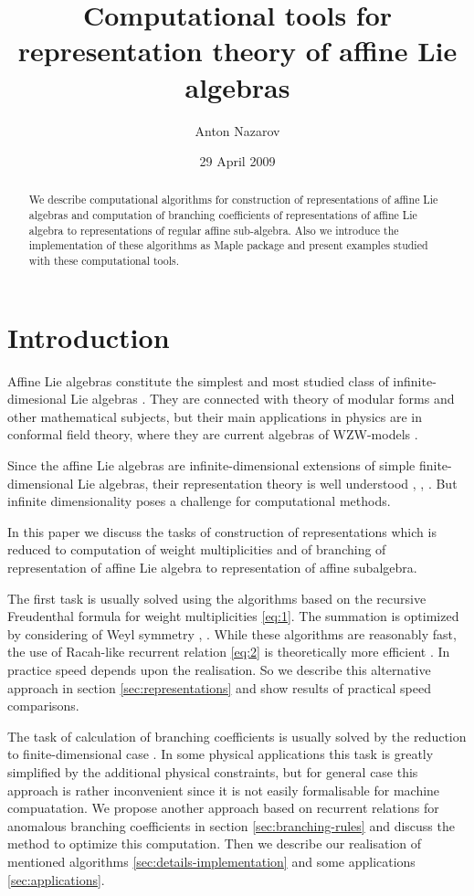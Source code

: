 \documentclass[a4paper,12pt]{article}
\title{Computational tools for representation theory of affine Lie algebras}
\author{Anton Nazarov}
\date{29 April 2009}
\theoremstyle{definition} \newtheorem{Def}{Definition}
\begin{document}
\maketitle
\begin{abstract}
  We describe computational algorithms for construction of
  representations of affine Lie algebras and computation of branching
  coefficients of representations of affine Lie algebra to
  representations of regular affine sub-algebra. Also we introduce the
  implementation of these algorithms as Maple package and present
  examples studied with these computational tools. 
\end{abstract}

\section{Introduction}
\label{sec:introduction}

Affine Lie algebras constitute the simplest and most studied class of
infinite-dimesional Lie algebras \cite{wakimoto2001idl,kac1990idl}. They are connected with theory of
modular forms and other mathematical subjects, but their main
applications in physics are in conformal field theory, where they are
current algebras of WZW-models \cite{Walton:1999xc,witten1984nab}.

Since the affine Lie algebras are infinite-dimensional extensions of simple finite-dimensional Lie algebras, their representation theory is well understood \cite{kac1990idl}, \cite{wakimoto2001idl}, \cite{wakimoto2001lectures}. But infinite dimensionality poses a challenge for computational methods.

In this paper we discuss the tasks of construction of representations which is reduced to computation of weight multiplicities and of branching of representation of affine Lie algebra to representation of affine subalgebra.

The first task is usually solved using the algorithms based on the
recursive Freudenthal formula for weight multiplicities \eqref{eq:1}.
The summation is optimized by considering of Weyl symmetry \cite{kass1990ala}, \cite{moody1982fast}. While these algorithms are reasonably fast, the use of Racah-like recurrent relation \eqref{eq:2} is theoretically more efficient \cite{Nazarov2008}. In practice speed depends upon the realisation. So we describe this alternative approach in section \ref{sec:representations} and show results of practical speed comparisons.

The task of calculation of branching coefficients is usually solved by the reduction to finite-dimensional case \cite{difrancesco1997cft}. In some physical applications this task is greatly simplified by the additional physical constraints, but for general case this approach is rather inconvenient since it is not easily formalisable for machine compuatation. We propose another approach based on recurrent relations for anomalous branching coefficients \cite{ilyin812pbc} in section \ref{sec:branching-rules} and discuss the method to optimize this computation. Then we describe our realisation of mentioned algorithms \ref{sec:details-implementation} and some applications \ref{sec:applications}.
\end{document}
